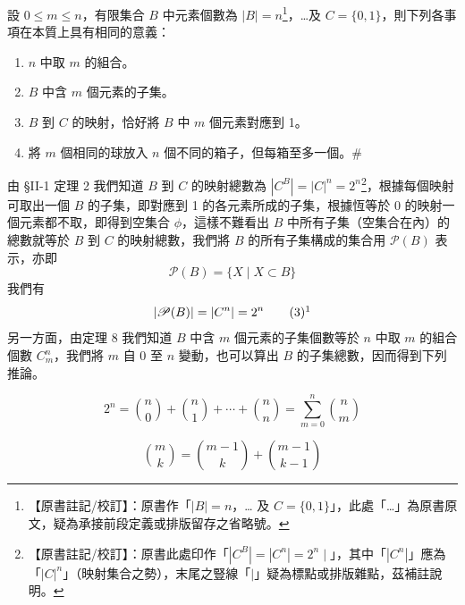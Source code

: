 \medskip
\begin{theorem}\label{thm:b5s-2-8}
設 $0 \le m \le n$，有限集合 $B$ 中元素個數為 $|B| = n$\label{note:b5s-ch2-p76-thm8-dots}\footnote{【原書註記/校訂】：原書作「$|B| = n$，… 及 $C = \{0, 1\}$」，此處「…」為原書原文，疑為承接前段定義或排版留存之省略號。}，\dots 及 $C = \{0, 1\}$，則下列各事項在本質上具有相同的意義：
\begin{enumerate}[label=(\roman*), topsep=2pt, itemsep=4pt]
  \item $n$ 中取 $m$ 的組合。
  \item $B$ 中含 $m$ 個元素的子集。
  \item $B$ 到 $C$ 的映射，恰好將 $B$ 中 $m$ 個元素對應到 1。
  \item 將 $m$ 個相同的球放入 $n$ 個不同的箱子，但每箱至多一個。\hfill $\#$
\end{enumerate}
\end{theorem}

由 §II-1 定理 2 我們知道 $B$ 到 $C$ 的映射總數為 $|C^B| = |C|^n = 2^n$\label{note:b5s-ch2-p77-cb}\footnote{【原書註記/校訂】：原書此處印作「$|C^B| = |C^n| = 2^n \mid$」，其中「$|C^n|$」應為「$|C|^n$」（映射集合之勢），末尾之豎線「$\mid$」疑為標點或排版雜點，茲補註說明。}，根據每個映射可取出一個 $B$ 的子集，即對應到 1 的各元素所成的子集，根據恆等於 0 的映射一個元素都不取，即得到空集合 $\phi$，這樣不難看出 $B$ 中所有子集（空集合在內）的總數就等於 $B$ 到 $C$ 的映射總數，我們將 $B$ 的所有子集構成的集合用 $\mathscr{P}(B)$ 表示，亦即
\[
\mathscr{P}(B) = \{X \mid X \subset B\}
\]
我們有
\label{note:b5s-ch2-p77-pn}
\begin{equation}
|\mathscr{P}(B)| = |C^n| = 2^n \tag{3}\footnotemark
\end{equation}
另一方面，由定理 8 我們知道 $B$ 中含 $m$ 個元素的子集個數等於 $n$ 中取 $m$ 的組合個數 $C_m^n$，我們將 $m$ 自 0 至 $n$ 變動，也可以算出 $B$ 的子集總數，因而得到下列推論。

\medskip
\begin{corollary*}
\begin{equation}
2^n = \binom{n}{0} + \binom{n}{1} + \cdots + \binom{n}{n} = \sum_{m=0}^n \binom{n}{m} \tag{4}
\end{equation}
\end{corollary*}

\medskip
\begin{corollary*}
\[
\binom{m}{k} = \binom{m-1}{k} + \binom{m-1}{k-1}
\]
\end{corollary*}
